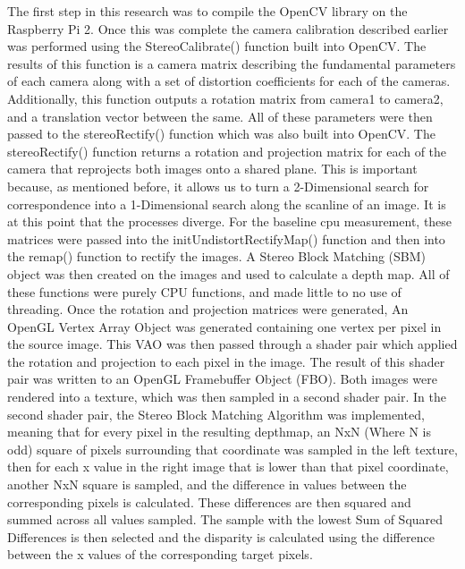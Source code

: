 The first step in this research was to compile the OpenCV library on the Raspberry Pi 2.  Once this was complete the camera calibration described earlier was performed using the StereoCalibrate() function built into OpenCV.  The results of this function is a camera matrix describing the fundamental parameters of each camera along with a set of distortion coefficients for each of the cameras.  Additionally, this function outputs a rotation matrix from camera1 to camera2, and a translation vector between the same.  All of these parameters were then passed to the stereoRectify() function which was also built into OpenCV.  The stereoRectify() function returns a rotation and projection matrix for each of the camera that reprojects both images onto a shared plane.  This is important because, as mentioned before, it allows us to turn a 2-Dimensional search for correspondence into a 1-Dimensional search along the scanline of an image.  It is at this point that the processes diverge.  For the baseline cpu measurement, these matrices were passed into the initUndistortRectifyMap() function and then into the remap() function to rectify the images.  A Stereo Block Matching (SBM) object was then created on the images and used to calculate a depth map.  All of these functions were purely CPU functions, and made little to no use of threading.  Once the rotation and projection matrices were generated, An OpenGL Vertex Array Object was generated containing one vertex per pixel in the source image.  This VAO was then passed through a shader pair which applied the rotation and projection to each pixel in the image.  The result of this shader pair was written to an OpenGL Framebuffer Object (FBO).  Both images were rendered into a texture, which was then sampled in a second shader pair.  In the second shader pair, the Stereo Block Matching Algorithm was implemented, meaning that for every pixel in the resulting depthmap, an NxN (Where N is odd) square of pixels surrounding that coordinate was sampled in the left texture, then for each x value in the right image that is lower than that pixel coordinate, another NxN square is sampled, and the difference in values between the corresponding pixels is calculated.  These differences are then squared and summed across all values sampled.  The sample with the lowest Sum of Squared Differences is then selected and the disparity is calculated using the difference between the x values of the corresponding target pixels.
